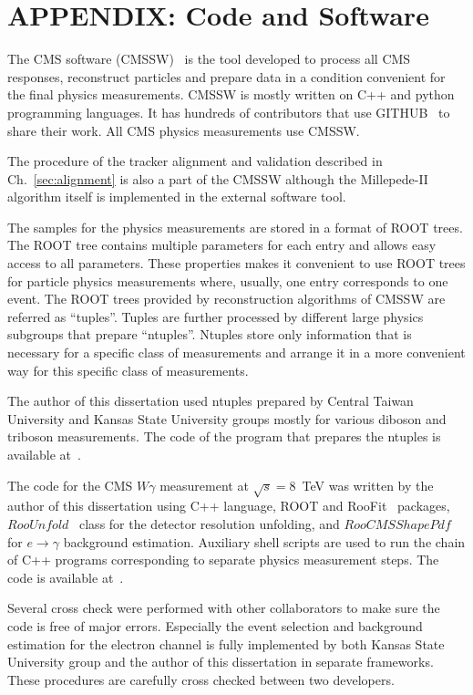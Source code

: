 \section{APPENDIX: Code and Software}
\label{sec:Code}


The CMS software (CMSSW)~\cite{ref_CMSSW} is the tool developed to process all CMS responses, reconstruct particles and prepare data in a condition convenient for the final physics measurements. CMSSW is mostly written on C++ and python programming languages. It has hundreds of contributors that use GITHUB~\cite{ref_GITHUB} to share their work. All CMS physics measurements use CMSSW.

The procedure of the tracker alignment and validation described in Ch.~\ref{sec:alignment} is also a part of the CMSSW although the Millepede-II algorithm itself is implemented in the external software tool.

The samples for the physics measurements are stored in a format of ROOT trees. The ROOT tree contains multiple parameters for each entry and allows easy access to all parameters. These properties makes it convenient to use ROOT trees for particle physics measurements where, usually, one entry corresponds to one event. The ROOT trees provided by reconstruction algorithms of CMSSW are referred as ``tuples''. Tuples are further processed by different large physics subgroups that prepare ``ntuples''. Ntuples store only information that is necessary for a specific class of measurements and arrange it in a more convenient way for this specific class of measurements.  

The author of this dissertation used ntuples prepared by Central Taiwan University and Kansas State University groups mostly for various diboson and triboson measurements. The code of the program that prepares the ntuples is available at~\cite{ref_ggNtuplizer}.

The code for the CMS $W\gamma$ measurement at $\sqrt{s}=8$~TeV was written by the author of this dissertation using C++ language, ROOT and RooFit~\cite{ref_RooFit} packages, $RooUnfold$~\cite{ref_RooUnfold} class for the detector resolution unfolding, and $RooCMSShapePdf$~\cite{ref_RooCMSShapePdf} for $e\rightarrow\gamma$ background estimation. Auxiliary shell scripts are used to run the chain of C++ programs corresponding to separate physics measurement steps. The code is available at~\cite{ref_GITHUB}.

Several cross check were performed with other collaborators to make sure the code is free of major errors. Especially the event selection and background estimation for the electron channel is fully implemented by both Kansas State University group and the author of this dissertation in separate frameworks. These procedures are carefully cross checked between two developers.  
